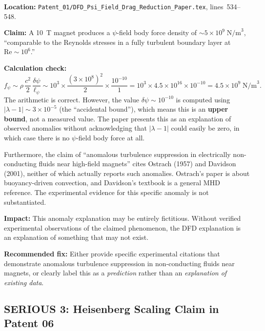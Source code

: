 \documentclass[12pt,a4paper]{article}
\begin{document}
\begin{serious}
\textbf{Location:} \texttt{Patent\_01/DFD\_Psi\_Field\_Drag\_Reduction\_Paper.tex},
lines~534--548.

\medskip
\textbf{Claim:} A 10~T magnet produces a $\psi$-field body force density of
$\sim 5\times 10^9\;\text{N/m}^3$, ``comparable to the Reynolds stresses in a
fully turbulent boundary layer at $\text{Re} \sim 10^6$.''

\medskip
\textbf{Calculation check:}
\[
f_\psi \sim \rho\,\frac{c^2}{2}\,\frac{\delta\psi}{\ell_\psi}
\sim 10^3 \times \frac{(3\times 10^8)^2}{2} \times \frac{10^{-10}}{1}
= 10^3 \times 4.5\times 10^{16} \times 10^{-10}
= 4.5\times 10^9\;\text{N/m}^3.
\]
The arithmetic is correct. However, the value $\delta\psi \sim 10^{-10}$
is computed using $|\lambda - 1| \sim 3\times 10^{-5}$ (the ``accidental
bound''), which means this is an \textbf{upper bound}, not a measured
value. The paper presents this as an explanation of observed anomalies
without acknowledging that $|\lambda - 1|$ could easily be zero, in which
case there is no $\psi$-field body force at all.

\medskip
Furthermore, the claim of ``anomalous turbulence suppression in
electrically non-conducting fluids near high-field magnets'' cites
Ostrach (1957) and Davidson (2001), neither of which actually reports
such anomalies. Ostrach's paper is about buoyancy-driven convection,
and Davidson's textbook is a general MHD reference. The experimental
evidence for this specific anomaly is not substantiated.

\medskip
\textbf{Impact:} This anomaly explanation may be entirely fictitious.
Without verified experimental observations of the claimed phenomenon,
the DFD explanation is an explanation of something that may not exist.

\medskip
\textbf{Recommended fix:} Either provide specific experimental citations
that demonstrate anomalous turbulence suppression in non-conducting fluids
near magnets, or clearly label this as a \textit{prediction} rather than
an \textit{explanation of existing data}.
\end{serious}

\subsection{SERIOUS 3: Heisenberg Scaling Claim in Patent 06}
\label{sec:ser3}
\end{document}
